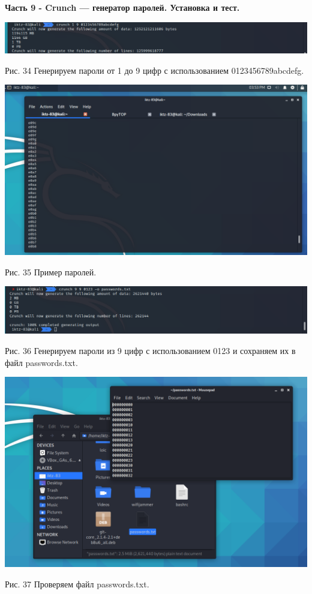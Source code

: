 \documentclass[a4paper,14pt]{extarticle}
\begin{document}
    \newpage
    \textbf{Часть 9 - Crunch — генератор паролей. Установка и тест.}
    \begin{center}

        \includegraphics[scale=0.4]{pics/34.png}

        Рис. 34 Генерируем пароли от 1 до 9 цифр с использованием 0123456789abcdefg.

        \includegraphics[scale=0.4]{pics/35.png}

        Рис. 35 Пример паролей.

        \includegraphics[scale=0.4]{pics/36.png}

        \begin{singlespace}
            Рис. 36 Генерируем пароли из 9 цифр с использованием 0123 и сохраняем их в файл passwords.txt.
        \end{singlespace}

        \includegraphics[scale=0.33]{pics/37.png}

        Рис. 37 Проверяем файл passwords.txt.

   \end{center}
\end{document}

